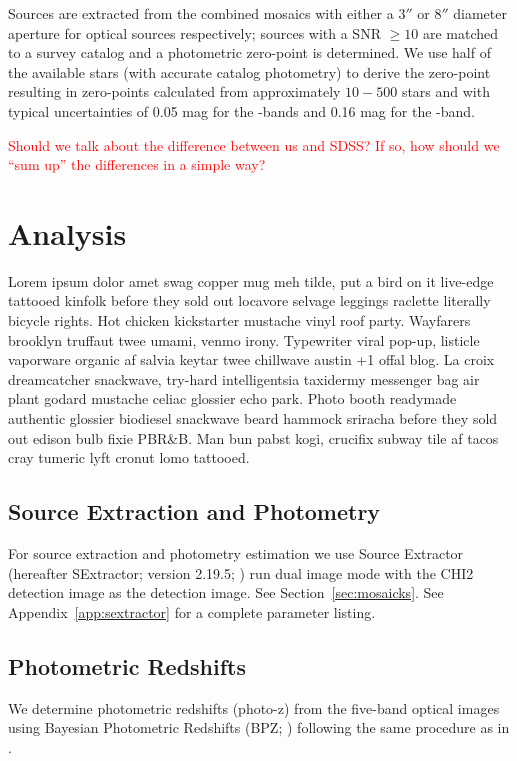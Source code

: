 \documentclass[apj, revtex4-1]{emulateapj}
\newcommand{\editorial}[1]{\textcolor{red}{#1}}
\begin{document}
Sources are extracted from the combined mosaics with either a $3''$ or $8''$ diameter aperture for optical sources respectively; sources with a SNR $\ge10$ are matched to a survey catalog and a photometric zero-point is determined. We use half of the available stars (with accurate catalog photometry) to derive the zero-point resulting in zero-points calculated from approximately $10-500$ stars and with typical uncertainties of 0.05 mag for the \sdssg\sdssr\sdssi-bands and 0.16 mag for the \sdssz-band.

\editorial{Should we talk about the difference between us and SDSS? If so, how should we ``sum up'' the differences in a simple way?}

\section{Analysis}\label{sec:analysis}
Lorem ipsum dolor amet swag copper mug meh tilde, put a bird on it live-edge tattooed kinfolk before they sold out locavore selvage leggings raclette literally bicycle rights. Hot chicken kickstarter mustache vinyl roof party. Wayfarers brooklyn truffaut twee umami, venmo irony. Typewriter viral pop-up, listicle vaporware organic af salvia keytar twee chillwave austin +1 offal blog. La croix dreamcatcher snackwave, try-hard intelligentsia taxidermy messenger bag air plant godard mustache celiac glossier echo park. Photo booth readymade authentic glossier biodiesel snackwave beard hammock sriracha before they sold out edison bulb fixie PBR\&B. Man bun pabst kogi, crucifix subway tile af tacos cray tumeric lyft cronut lomo tattooed.

\subsection{Source Extraction and Photometry}
For source extraction and photometry estimation we use Source Extractor (hereafter SExtractor; version 2.19.5; \citealt{Bertin1996}) run dual image mode with the CHI2 detection image as the detection image. See Section~\ref{sec:mosaicks}. See Appendix~\ref{app:sextractor} for a complete parameter listing.

\subsection{Photometric Redshifts}
We determine photometric redshifts (photo-z) from the five-band optical images using Bayesian Photometric Redshifts (BPZ; \citealt{Benitez2000, Coe2006}) following the same procedure as in \cite{Menanteau2009a}.
\end{document}
